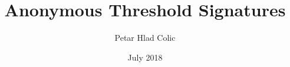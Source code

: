 \documentclass[envcountsect]{beamer}
\title{Anonymous Threshold Signatures}
\author{Petar Hlad Colic}
\institute{Universitat Polit\`ecnica de Catalunya}
\date{July 2018}
\begin{document}
    \frame{\titlepage}
    
    \frame{\tableofcontents}
    
    
    
    
    
    
    
    
    
\end{document}
